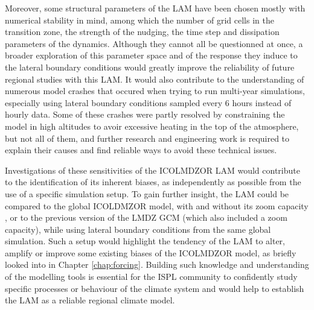 Moreover, some structural parameters of the LAM have been chosen mostly with numerical stability in mind, among which the number of grid cells in the transition zone, the strength of the nudging, the time step and dissipation parameters of the dynamics. 
Although they cannot all be questionned at once, a broader exploration of this parameter space and of the response they induce to the lateral boundary conditions would greatly improve the reliability of future regional studies with this LAM. 
It would also contribute to the understanding of numerous model crashes that occured when trying to run multi-year simulations, especially using lateral boundary conditions sampled every 6 hours instead of hourly data. Some of these crashes were partly resolved by constraining the model in high altitudes to avoir excessive heating in the top of the atmosphere, but not all of them, and further research and engineering work is required to explain their causes and find reliable ways to avoid these technical issues.

Investigations of these sensitivities of the ICOLMDZOR LAM would contribute to the identification of its inherent biases, as independently as possible from the use of a specific simulation setup.
To gain further insight, the LAM could be compared to the global ICOLDMZOR model, with and without its zoom capacity \citep{borella_new_2025}, or to the previous version of the LMDZ GCM (which also included a zoom capacity), while using lateral boundary conditions from the same global simulation.
Such a setup would highlight the tendency of the LAM to alter, amplify or improve some existing biases of the ICOLMDZOR model, as briefly looked into in Chapter \ref{chap:forcing}.
Building such knowledge and understanding of the modelling tools is essential for the ISPL community to confidently study specific processes or behaviour of the climate system and would help to establish the LAM as a reliable regional climate model.

